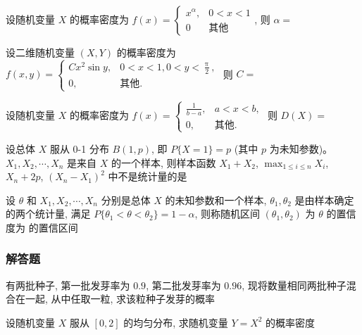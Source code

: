 \begin{ti}
	设随机变量 $X$ 的概率密度为 $f(x) = \begin{cases}
		x^{\alpha}, & 0 < x < 1 \\
		0 & \text{其他}
	\end{cases}$, 则 $\alpha = $ \hua
\end{ti}

\begin{ti}
	设二维随机变量 $(X,Y)$ 的概率密度为 $f(x,y) = \begin{cases}
		C x^{2} \sin y, & 0 < x < 1, 0 < y < \frac{\uppi}{2}, \\
		0, & \text{其他}.
	\end{cases}$ 则 $C = $ \hua
\end{ti}

\begin{ti}
	设随机变量 $X$ 的概率密度为 $f(x) = \begin{cases}
		\frac{1}{b - a}, & a < x < b, \\
		0, & \text{其他}.
	\end{cases}$ 则 $D(X) = $ \hua
\end{ti}

\begin{ti}
	设总体 $X$ 服从 0-1 分布 $B(1,p)$, 即 $P\{ X = 1 \} = p$ (其中 $p$ 为未知参数)。$X_{1},X_{2},\cdots,X_{n}$ 是来自 $X$ 的一个样本, 则样本函数 $X_{1} + X_{2}$, $\max_{1 \leqslant i \leqslant n} X_{i}$, $X_{n} + 2p$, $(X_{n} - X_{1})^{2}$ 中不是统计量的是 \hua
\end{ti}

\begin{ti}
	设 $\theta$ 和 $X_{1},X_{2},\cdots,X_{n}$ 分别是总体 $X$ 的未知参数和一个样本, $\theta_{1},\theta_{2}$ 是由样本确定的两个统计量, 满足 $P\{ \theta_{1} < \theta < \theta_{2} \} = 1 - \alpha$, 则称随机区间 $(\theta_{1},\theta_{2})$ 为 $\theta$ 的置信度为 \hua{} 的置信区间
\end{ti}

\subsubsection{解答题}
\begin{ti}
	有两批种子, 第一批发芽率为 $0.9$, 第二批发芽率为 $0.96$, 现将数量相同两批种子混合在一起, 从中任取一粒, 求该粒种子发芽的概率
\end{ti}

\begin{ti}
	设随机变量 $X$ 服从 $[0,2]$ 的均匀分布, 求随机变量 $Y = X^{2}$ 的概率密度
\end{ti}

